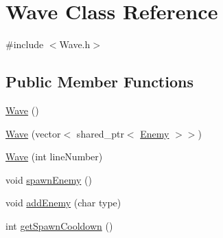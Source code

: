 \hypertarget{class_wave}{\section{Wave Class Reference}
\label{class_wave}
}


{\ttfamily \#include $<$Wave.\+h$>$}

\subsection*{Public Member Functions}
\begin{DoxyCompactItemize}
\item 
\hyperlink{class_wave_a3d8144ec0d6c0b0ede77ff59f54471aa}{Wave} ()
\item 
\hyperlink{class_wave_a774b08c0e12725a67094d5d1c3ed3553}{Wave} (vector$<$ shared\+\_\+ptr$<$ \hyperlink{class_enemy}{Enemy} $>$$>$)
\item 
\hyperlink{class_wave_a790eb8701e1bd20558b39cbafe20d36c}{Wave} (int line\+Number)
\item 
void \hyperlink{class_wave_a22532b46c406de513257a30e9f997264}{spawn\+Enemy} ()
\item 
void \hyperlink{class_wave_a7f2f45dca94480f64fe0ede4e7b53056}{add\+Enemy} (char type)
\item 
int \hyperlink{class_wave_a0b2ae90f612c1f8d0e7c595ac36092e6}{get\+Spawn\+Cooldown} ()
\end{DoxyCompactItemize}


